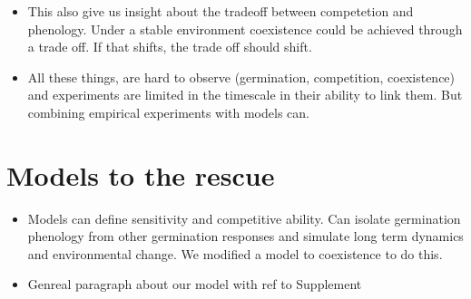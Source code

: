 \documentclass{article}[12pt]
\begin{document}
\begin{itemize}
\item This also give us insight about the tradeoff between competetion and phenology. Under a stable environment coexistence could be achieved through a trade off. If that shifts, the trade off should shift. 
\item All these things, are hard to observe (germination, competition, coexistence) and experiments are limited in the timescale in their ability to link them. But combining empirical experiments with models can.
\end{itemize}

\section{Models to the rescue}
\begin{itemize}
\item Models can define sensitivity and competitive ability. Can isolate germination phenology from other germination responses and simulate long term dynamics and environmental change. We modified a model to coexistence to do this.

\item  Genreal paragraph about our model with ref to Supplement

\end{itemize}

\end{document}
